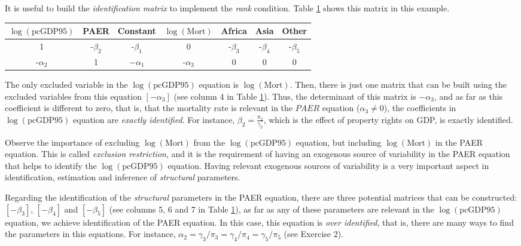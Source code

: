 It is useful to build the \textit{identification matrix} to implement the \textit{rank} condition. Table \ref{tab:71} shows this matrix in this example.

\begin{table}[!h]
	\label{tab:71}%
	\begin{tabular}{ccccccc}
		$\log(\text{pcGDP95})$ & PAER & Constant & $\log(\text{Mort})$ & Africa & Asia & Other \\
		\hline
		1 & -$\beta_2$ & -$\beta_1$ & 0 & -$\beta_3$ & -$\beta_4$ & -$\beta_5$\\
		-$\alpha_2$ & 1 & $-\alpha_1$ & -$\alpha_3$ & 0 & 0 & 0 \\
	\end{tabular}
\end{table}

The only excluded variable in the $\log(\text{pcGDP95})$ equation is $\log(\text{Mort})$. Then, there is just one matrix that can be built using the excluded variables from this equation $[-\alpha_3]$ (see column 4 in Table \ref{tab:71}). Thus, the determinant of this matrix is $-\alpha_3$, and as far as this coefficient is different to zero, that is, that the mortality rate is relevant in the $PAER$ equation ($\alpha_3\neq 0$), the coefficients in $\log(\text{pcGDP95})$ equation are \textit{exactly identified}. For instance, $\beta_2=\frac{\pi_2}{\gamma_2}$, which is the effect of property rights on GDP, is exactly identified. 

Observe the importance of excluding $\log(\text{Mort})$ from the $\log(\text{pcGDP95})$ equation, but including $\log(\text{Mort})$ in the PAER equation. This is called \textit{exclusion restriction}, and it is the requirement of having an exogenous source of variability in the PAER equation that helps to identify the $\log(\text{pcGDP95})$ equation. Having relevant exogenous sources of variability is a very important aspect in identification, estimation and inference of \textit{structural} parameters.

Regarding the identification of the \textit{structural} parameters in the PAER equation, there are three potential matrices that can be constructed: $[-\beta_3]$, $[-\beta_4]$ and $[-\beta_5]$ (see columns 5, 6 and 7 in Table \ref{tab:71}), as far as any of these parameters are relevant in the $\log(\text{pcGDP95})$ equation, we achieve identification of the PAER equation. In this case, this equation is \textit{over identified}, that is, there are many ways to find the parameters in this equations. For instance, $\alpha_2=\gamma_3/\pi_3=\gamma_4/\pi_4=\gamma_5/\pi_5$ (see Exercise 2).


